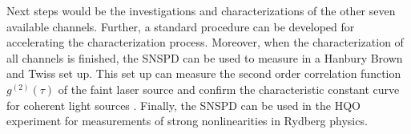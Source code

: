 Next steps would be the investigations and characterizations of the other seven available channels.
Further, a standard procedure can be developed for accelerating the characterization process.
Moreover, when the characterization of all channels is finished, the SNSPD can be used to measure in a Hanbury Brown and
Twiss set up.
This set up can measure the second order correlation function $g^{(2)}(\tau)$ of the faint laser source and confirm
the characteristic constant curve for coherent light sources \cite{glauber-1963}.
Finally, the SNSPD can be used in the HQO experiment for measurements of strong nonlinearities in Rydberg physics.

